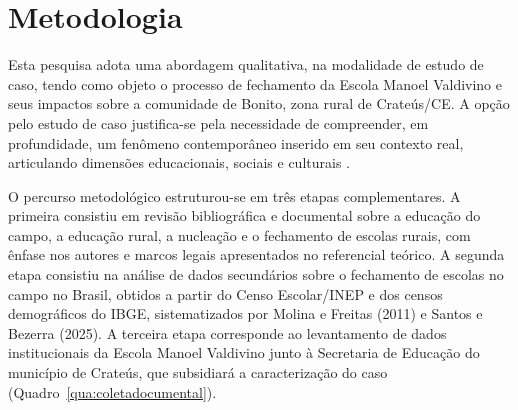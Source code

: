 \documentclass[
  12pt,
  openright,
  twoside,
  a4paper,
  english,
  brazilian,
  sumario=tradicional
]{abntex2}
\begin{document}
\section{Metodologia}
Esta pesquisa adota uma abordagem qualitativa, na modalidade de estudo de caso, tendo como objeto o processo de fechamento da Escola Manoel Valdivino e seus impactos sobre a comunidade de Bonito, zona rural de Crateús/CE. A opção pelo estudo de caso justifica-se pela necessidade de compreender, em profundidade, um fenômeno contemporâneo inserido em seu contexto real, articulando dimensões educacionais, sociais e culturais \cite[p.~19]{antunesrocha2014}.

O percurso metodológico estruturou-se em três etapas complementares. A primeira consistiu em revisão bibliográfica e documental sobre a educação do campo, a educação rural, a nucleação e o fechamento de escolas rurais, com ênfase nos autores e marcos legais apresentados no referencial teórico. A segunda etapa consistiu na análise de dados secundários sobre o fechamento de escolas no campo no Brasil, obtidos a partir do Censo Escolar/INEP e dos censos demográficos do IBGE, sistematizados por Molina e Freitas (2011) e Santos e Bezerra (2025). A terceira etapa corresponde ao levantamento de dados institucionais da Escola Manoel Valdivino junto à Secretaria de Educação do município de Crateús, que subsidiará a caracterização do caso (Quadro~\ref{qua:coletadocumental}).
\end{document}

